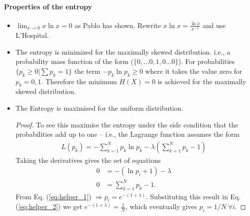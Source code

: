 \documentclass[10pt,a4paper]{article}
\begin{document}
\paragraph*{Properties of the entropy}
\begin{itemize}
\item $\lim _{x \rightarrow 0 }x \ln x = 0 $ as Pablo has shown. Rewrite $x \ln x = \frac{\ln x}{x^{-1}}$ and use L'Hospital. 
\item The entropy is minimized for the maximally skewed distribution. i.e., a probability mass function of the form ($\{0,\dots 0,1,0\dots 0\}$). For probabilities $\{p_k \geq 0 | \sum p_k =1 \}$ the term $-p_k \ln p_k \geq 0$ where it takes the value zero for $p_k = 0,1$. Therefore the minimum $H(X)=0$ is achieved for the maximally skewed distribution.
\item The Entropy is maximised for the uniform distribution. 
\begin{proof}
To see this maximise the entropy under the side condition that the probabilities add up to one -- i.e., the Lagrange function assumes the form
\begin{align}
L(p_k) = -\sum_{k=1}^N p_k \ln p_k -\lambda \left(\sum_{k=1}^N p_k -1 \right)
\end{align} 
Taking the derivatives gives the set of equations
\begin{align}
0 &= - \left( \ln p_i + 1 \right) - \lambda \label{eq:helper_1}\\
0 &= \sum_{k=1}^N p_k -1 \label{eq:helper_2}.
\end{align}
From Eq. (\ref{eq:helper_1}) $\Rightarrow p_i = e^{-(1+\lambda)}$. Substituting this result in Eq. (\ref{eq:helper_2})
we get  $e^{-(1+\lambda)} = \frac{1}{N}$, which eventually gives $p_i = 1/N ~ \forall i$. 
\end{proof}
\end{itemize}
\end{document}
